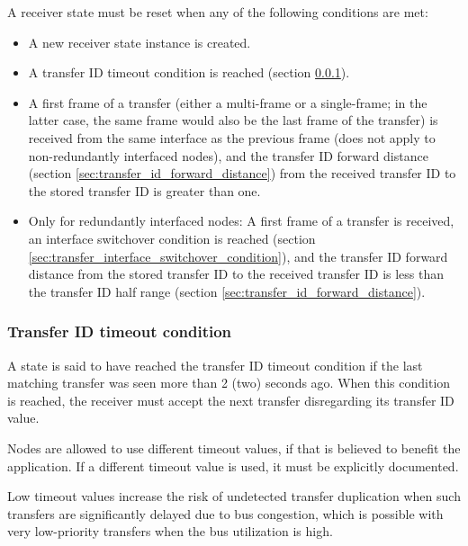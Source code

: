 A receiver state must be reset when any of the following conditions are met:

\begin{itemize}
    \item A new receiver state instance is created.

    \item A transfer ID timeout condition is reached (section \ref{sec:transfer_id_timeout_condition}).

    \item A first frame of a transfer (either a multi-frame or a single-frame; in the latter case, the same frame
    would also be the last frame of the transfer) is received from the same interface as the previous frame
    (does not apply to non-redundantly interfaced nodes),
    and the transfer ID forward distance (section \ref{sec:transfer_id_forward_distance}) from the received
    transfer ID to the stored transfer ID is greater than one.

    \item Only for redundantly interfaced nodes: A first frame of a transfer is received,
    an interface switchover condition is reached (section \ref{sec:transfer_interface_switchover_condition}),
    and the transfer ID forward distance from the stored transfer ID to the received transfer ID is
    less than the transfer ID half range (section \ref{sec:transfer_id_forward_distance}).
\end{itemize}

\subsubsection{Transfer ID timeout condition}\label{sec:transfer_id_timeout_condition}

A state is said to have reached the transfer ID timeout condition
if the last matching transfer was seen more than 2 (two) seconds ago.
When this condition is reached, the receiver must accept the next transfer disregarding its transfer ID value.

Nodes are allowed to use different timeout values, if that is believed to benefit the application.
If a different timeout value is used, it must be explicitly documented.

Low timeout values increase the risk of undetected transfer duplication when such transfers are significantly
delayed due to bus congestion, which is possible with very low-priority transfers when the bus utilization is high.

